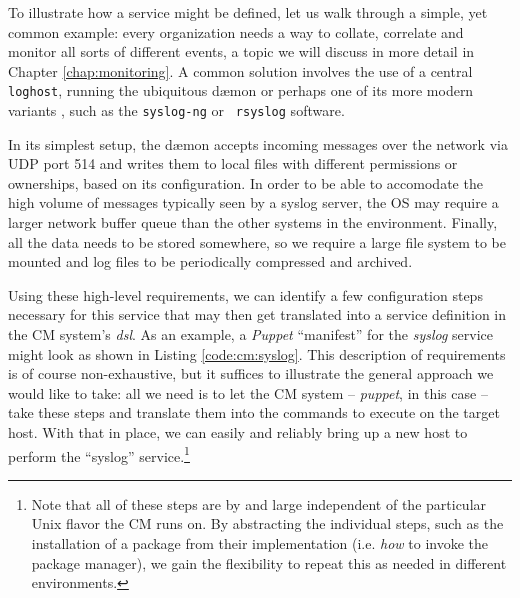 To illustrate how a service might be defined, let us
walk through a simple, yet common example:  every
organization needs a way to collate, correlate and
monitor all sorts of different events, a topic we will
discuss in more detail in Chapter
\ref{chap:monitoring}.  A common solution involves the
use of a central {\tt loghost}, running the ubiquitous
 d\ae mon or perhaps one of its more
modern variants , such as the {\tt syslog-ng} or {\tt
rsyslog} software.

In its simplest setup, the d\ae mon accepts incoming
messages over the network via UDP port 514 and writes
them to local files with different permissions or
ownerships, based on its configuration.  In order to
be able to accomodate the high volume of messages
typically seen by a syslog server, the OS may require
a larger network buffer queue than the other systems
in the environment.  Finally, all the data needs to be
stored somewhere, so we require a large file system to
be mounted and log files to be periodically compressed
and archived.

Using these high-level requirements, we can identify a
few configuration steps necessary for this service
that may then get translated into a service definition
in the CM system's {\em \gls{dsl}}.  As
an example, a {\em Puppet} ``manifest''
for the {\em syslog} service might look as shown in
Listing \ref{code:cm:syslog}.  This description of
requirements is of course non-exhaustive, but it
suffices to illustrate the general approach we would
like to take: all we need is to let the CM system --
{\em puppet}, in this case -- take these steps and
translate them into the commands to execute on the
target host.  With that in place, we can easily and
reliably bring up a new host to perform the
``syslog'' service.\footnote{Note that all of these
steps are by and large independent of the particular
Unix flavor the CM runs on.  By abstracting the
individual steps, such as the installation of a
package from their implementation (i.e. {\em how} to
invoke the package manager), we gain the flexibility
to repeat this as needed in different environments.}

